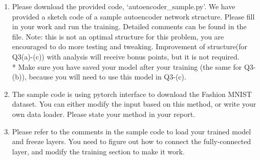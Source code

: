 \documentclass[a4paper]{article}
\begin{document}
	\begin{enumerate}
	\item Please download the provided code, `autoencoder\_sample.py'. We have provided a sketch code of a sample autoencoder network structure. Please fill in your work and run the training. Detailed comments can be found in the file. Note: this is not an optimal structure for this problem, you are encouraged to do more testing and tweaking. Improvement of structure(for Q3(a)-(c)) with analysis will receive bonus points, but it is not required.\\ 
	* Make sure you have saved your model after your training (the same for Q3-(b)), because you will need to use this model in Q3-(c). 
	\item The sample code is using pytorch interface to download the Fashion MNIST dataset. You can either modify the input based on this method, or write your own data loader. Please state your method in your report.
	\item  Please refer to the comments in the sample code to load your trained model and freeze layers. You need to figure out how to connect the fully-connected layer, and modify the training section to make it work.
	\end{enumerate}
	
\end{document}
